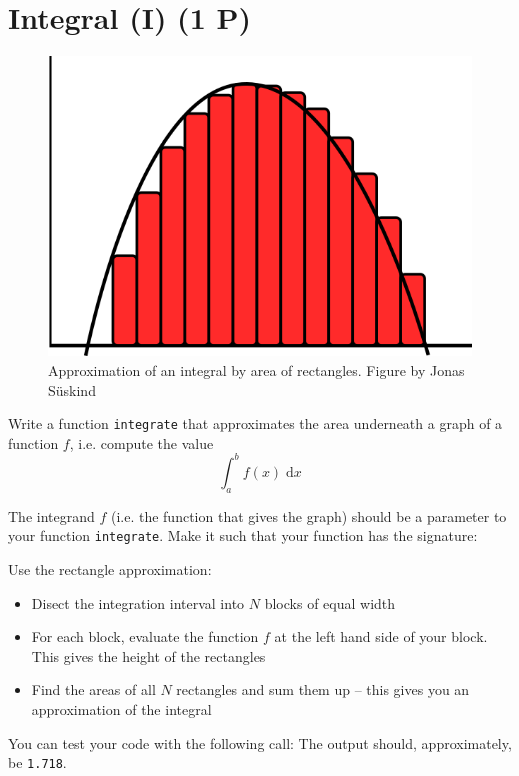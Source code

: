 \documentclass[
	english,
	fontsize=10pt,
	parskip=half,
	titlepage=true,
	DIV=12
]{scrartcl}
\newcommand*{\ie}{i.\;e. }
\begin{document}
\section{Integral (I) (1 P)}
\begin{figure}
	\includegraphics[width=\linewidth]{./integral}
	\caption{Approximation of an integral by area of rectangles.\newline
		Figure by Jonas Süskind}
	\vspace{-50pt}
\end{figure}
Write a function \texttt{integrate} that approximates the area underneath a graph of a function $f$, \ie compute the value
\[ \int_a^b f(x) \;\text{d}x \]

The integrand $f$ (\ie the function that gives the graph) should be a parameter to your function \texttt{integrate}. Make it such that your function has the signature:

Use the rectangle approximation:
\begin{itemize}
\item Disect the integration interval into $N$ blocks of equal width
\item For each block, evaluate the function $f$ at the left hand side of your block. This gives the height of the rectangles
\item Find the areas of all $N$ rectangles and sum them up -- this gives you an approximation of the integral
\end{itemize}

You can test your code with the following call:
The output should, approximately, be \texttt{1.718}.
\end{document}
